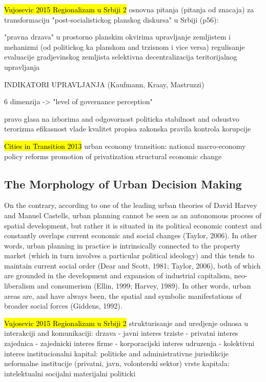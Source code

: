\documentclass[11pt]{report}
\begin{document}
\hl{Vujosevic 2015 Regionalizam u Srbiji 2}
osnovna pitanja (pitanja od znacaja) za transformaciju "post-socialistickog planskog diskursa" u Srbiji (p56):

    "pravna drzava" u prostorno planskim okvirima
    upravljanje zemljistem i mehanizmi (od politickog ka planskom and trzisnom i vice versa)
    regulisanje evaluacije gradjevinskog zemljista
    selektivna decentralizacija teritorijalnog upravljanja

INDIKATORI UPRAVLJANJA (Kaufmann, Kraay, Mastruzzi)

6 dimenzija -> "level of governance perception"

    pravo glasa na izborima and odgovornost
    politicka stabilnost and odsustvo terorizma
    efikasnost vlade
    kvalitet propisa
    zakonska pravila
    kontrola korupcije
    
\hl{Cities in Transition 2013}
urban economy transition:
    national macro-economy policy reforms
    promotion of privatization
    structural economic change

\subsection{The Morphology of Urban Decision Making}
On the contrary, according to one of the leading urban theories of David Harvey and Manuel Castells, urban planning cannot be seen as an autonomous process of spatial development, but rather it is situated in its political economic context and constantly overlaps current economic and social changes  (Taylor, 2006). In other words, urban planning in practice is intrinsically connected to the property market (which in turn involves a particular political ideology) and this tends to maintain current social order (Dear and Scott, 1981; Taylor, 2006), both of which are grounded in the development and expansion of industrial capitalism, neo-liberalism and consumerism (Ellin, 1999; Harvey, 1989). In other words, urban areas are, and have always been, the spatial and symbolic manifestations of broader social forces (Giddens, 1992).

\hl{Vujosevic 2015 Regionalizam u Srbiji 2}
strukturisanje and uredjenje odnosa u interakciji and komunikaciji:
    drzava - javni interes
    trziste - privatni interes
    zajednica - zajednicki interes
    firme - korporacijski interes
    udruzenja - kolektivni interes
institucionalni kapital:
    politicke and administrativne jurisdikcije
    neformalne institucije (privatni, javn, volonterski sektor)
vrste kapitala:
    intelektualni
    socijalni
    materijalni
    politicki
    
\end{document}
